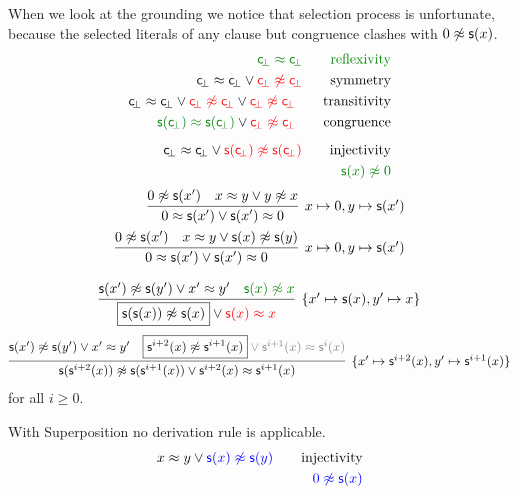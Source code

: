 \begin{example}\label{ex:nat:instgen}
	When we look at the grounding we notice that selection process is unfortunate,
	because the selected literals of any clause but congruence clashes with $0\not\approx{\mathsf s}(x)$.
	\begin{align*}
	\colHi \consbot \mEQ \consbot
	\tag*{reflexivity}\\
	{ \consbot \mEQ \consbot} \lor {\colLo \consbot \mNE \consbot}
	\tag*{symmetry}\\
	{ \consbot \mEQ \consbot} 
	\lor {\colLo \consbot \mNE \consbot} 
	\lor {\colLo \consbot\mNE \consbot}
	\tag*{transitivity}\\
	{\colHi \msucc(\consbot) \mEQ \msucc(\consbot)} \lor {\colLo \consbot \mNE \consbot}
	\tag*{congruence}\\[0.5em]
	{ \consbot \mEQ \consbot} \lor {\colLo \msucc(\consbot) \mNE \msucc(\consbot)}
	\tag*{injectivity}\\
	{\colHi \msucc(x) \mNE 0}
	\end{align*}
	\begin{align*}
	\infer[x\mapsto 0, y\mapsto \msucc(x') ]
	{ 0\mEQ\msucc(x')\lor \msucc(x')\mEQ 0}
	{
		0 \mNE\msucc(x')
		&
		x\mEQ y\lor y\mNE x
	}
\\
%
\infer[x\mapsto 0, y\mapsto \msucc(x') ]
{ 0\mEQ\msucc(x')\lor \msucc(x')\mEQ 0}
{
	0 \mNE \msucc(x')
	&
	x \mEQ y \lor \msucc(x)\mNE \msucc(y)	
}
	\end{align*}
\end{example}

	\begin{gather*}
	\infer[\{x'\mapsto \msucc (x), y'\mapsto x\}]{
		\boxed{\msucc (\msucc (x)) \mNE \msucc (x)} \lor\colLo \msucc (x)\mEQ x
	}{
		\msucc (x') \mNE \msucc (y') \lor x'\mEQ y' & \colHi\msucc (x) \mNE x
	}
	\end{gather*}
	\begin{gather*}
	\infer[\{x'\mapsto \msucc^{i+2} (x), y'\mapsto \msucc^{i+1} (x)\}]{
		\msucc (\msucc^{i+2} (x)) \mNE \msucc (\msucc^{i+1} (x)) \lor \msucc^{i+2} (x)\mEQ\msucc^{i+1} (x)
	}{
		\msucc (x') \mNE \msucc (y') \lor x'\mEQ y' & \boxed{\msucc^{i+2} (x) \mNE \msucc^{i+1} (x)}\colG \lor \msucc^{i+1} (x)\mEQ\msucc^{i}(x)
	}
	\end{gather*}
	for all $i\geq 0$.



\begin{example} With Superposition no derivation rule is applicable.
	\begin{align*}
	x \mEQ y \lor {\colN \msucc(x) \mNE \msucc(y)}
	\tag*{injectivity}\\
	{\colN 0 \mNE \msucc(x)}
	\end{align*}
\end{example}

